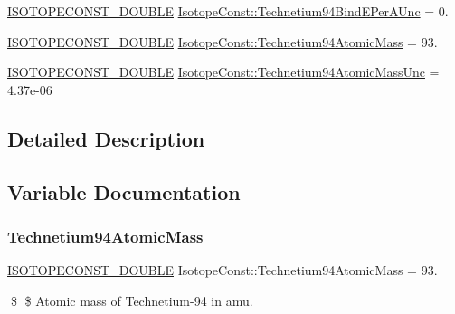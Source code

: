 \begin{DoxyCompactItemize}
\mbox{\hyperlink{group___isotope_const-_macros_ga8f45a7272ce02c0b4c65c44636ed719a}{I\+S\+O\+T\+O\+P\+E\+C\+O\+N\+S\+T\+\_\+\+D\+O\+U\+B\+LE}} \mbox{\hyperlink{group___isotope_const-_technetium-_tc94_ga4aa38a6d381e84bd9624030b82efccdc}{Isotope\+Const\+::\+Technetium94\+Bind\+E\+Per\+A\+Unc}} = 0.
\item 
\mbox{\hyperlink{group___isotope_const-_macros_ga8f45a7272ce02c0b4c65c44636ed719a}{I\+S\+O\+T\+O\+P\+E\+C\+O\+N\+S\+T\+\_\+\+D\+O\+U\+B\+LE}} \mbox{\hyperlink{group___isotope_const-_technetium-_tc94_ga1d79f249e24a10e71526c90f4eda71cc}{Isotope\+Const\+::\+Technetium94\+Atomic\+Mass}} = 93.
\item 
\mbox{\hyperlink{group___isotope_const-_macros_ga8f45a7272ce02c0b4c65c44636ed719a}{I\+S\+O\+T\+O\+P\+E\+C\+O\+N\+S\+T\+\_\+\+D\+O\+U\+B\+LE}} \mbox{\hyperlink{group___isotope_const-_technetium-_tc94_ga6e24aeeafddad9e9e06399e06425f79e}{Isotope\+Const\+::\+Technetium94\+Atomic\+Mass\+Unc}} = 4.\+37e-\/06
\end{DoxyCompactItemize}


\subsection{Detailed Description}


\subsection{Variable Documentation}
\mbox{\label{group___isotope_const-_technetium-_tc94_ga1d79f249e24a10e71526c90f4eda71cc}} 
\subsubsection{\texorpdfstring{Technetium94\+Atomic\+Mass}{Technetium94AtomicMass}}
{\footnotesize\ttfamily \mbox{\hyperlink{group___isotope_const-_macros_ga8f45a7272ce02c0b4c65c44636ed719a}{I\+S\+O\+T\+O\+P\+E\+C\+O\+N\+S\+T\+\_\+\+D\+O\+U\+B\+LE}} Isotope\+Const\+::\+Technetium94\+Atomic\+Mass = 93.}

\$ \$ Atomic mass of Technetium-\/94 in amu. \mbox{\label{group___isotope_const-_technetium-_tc94_ga6e24aeeafddad9e9e06399e06425f79e}} 
